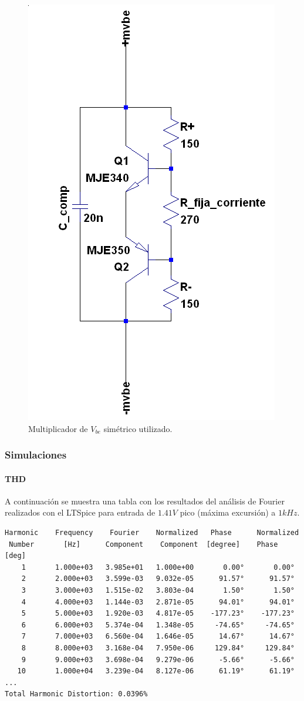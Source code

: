 \documentclass[a4paper,12pt,twoside]{article}
\begin{document}
\begin{figure}[H]
\centering
\includegraphics[height=0.3\textwidth]{img/sim/mvbe}
\caption{Multiplicador de $V_{be}$ simétrico utilizado.}
\label{fig:mvbe} 
\end{figure}




\subsubsection{Simulaciones}


\paragraph{THD} A continuación se muestra una tabla con los resultados del análisis de Fourier realizados con el LTSpice para entrada de $1.41V$ pico (máxima excursión) a $1kHz$. 




\begin{verbatim}
Harmonic	Frequency	 Fourier 	Normalized	 Phase  	Normalized
 Number 	  [Hz]   	Component	 Component	[degree]	Phase [deg]
    1   	1.000e+03	3.985e+01	1.000e+00	    0.00°	    0.00°
    2   	2.000e+03	3.599e-03	9.032e-05	   91.57°	   91.57°
    3   	3.000e+03	1.515e-02	3.803e-04	    1.50°	    1.50°
    4   	4.000e+03	1.144e-03	2.871e-05	   94.01°	   94.01°
    5   	5.000e+03	1.920e-03	4.817e-05	 -177.23°	 -177.23°
    6   	6.000e+03	5.374e-04	1.348e-05	  -74.65°	  -74.65°
    7   	7.000e+03	6.560e-04	1.646e-05	   14.67°	   14.67°
    8   	8.000e+03	3.168e-04	7.950e-06	  129.84°	  129.84°
    9   	9.000e+03	3.698e-04	9.279e-06	   -5.66°	   -5.66°
   10   	1.000e+04	3.239e-04	8.127e-06	   61.19°	   61.19°
...
Total Harmonic Distortion: 0.0396%


\end{verbatim}
\end{document}
